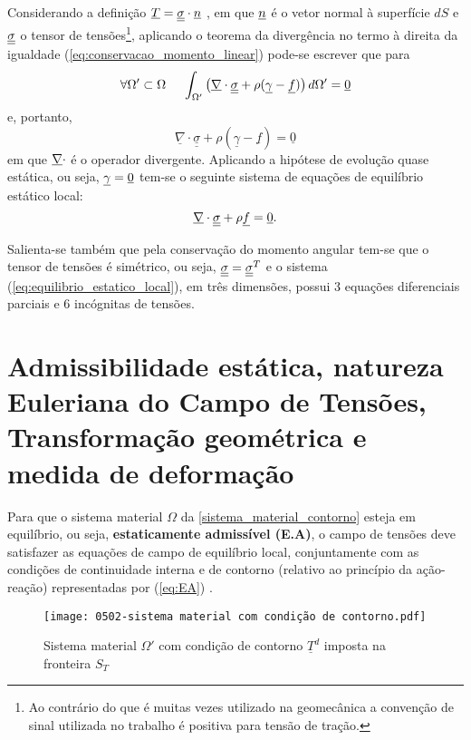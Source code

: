 Considerando a definição $\underline T = \underline{\underline \sigma} \cdot \underline n$ , em que $\underline n$ é o vetor normal à superfície $dS$ e $\underline{\underline \sigma}$ o tensor de tensões\footnote{Ao contrário do que é muitas vezes utilizado na geomecânica a convenção de sinal utilizada no trabalho é positiva para tensão de tração.}, aplicando o teorema da divergência no termo à direita da igualdade (\ref{eq:conservacao_momento_linear}) pode-se escrever que para
\begin{equation}
	\label{teorema_divergencia}
	\forall \Omega' \subset \Omega ~~~~ \int_{\Omega'}\left( \underline \nabla \cdot \underline{\underline \sigma}+ \rho(\underline \gamma-\underline f) \right)d\Omega' = \underline 0
\end{equation}
e, portanto,
\begin{equation}
	\label{eq:resultado_teorema_divergencia}
	 \underline \nabla \cdot \underline{\underline\sigma}+ \rho(\underline\gamma-\underline f) = \underline 0
\end{equation}
em que $\underline \nabla \cdot$ é o operador divergente. Aplicando a hipótese de evolução quase estática, ou seja, $\underline \gamma = \underline 0$ \cite[p. 369]{Salencon2001} tem-se o seguinte sistema de equações de equilíbrio estático local:
\begin{equation}
	\label{eq:equilibrio_estatico_local}
	\underline \nabla \cdot \underline{\underline \sigma}+ \rho \underline f = \underline 0.
\end{equation}

Salienta-se também que pela conservação do momento angular tem-se que o tensor de tensões é simétrico, ou seja, $\underline{\underline \sigma} = \underline{\underline \sigma}^T$ e o sistema (\ref{eq:equilibrio_estatico_local}), em três dimensões, possui 3 equações diferenciais parciais e 6 incógnitas de tensões.

\section{Admissibilidade estática, natureza Euleriana do Campo de Tensões, Transformação geométrica e medida de deformação}

Para que o sistema material $\Omega$ da \autoref{sistema_material_contorno} esteja em equilíbrio, ou seja, \textbf{estaticamente admissível (E.A)}, o campo de tensões deve satisfazer as equações de campo de equilíbrio local, conjuntamente com as condições de continuidade interna e de contorno (relativo ao princípio da ação-reação) representadas por (\ref{eq:EA}) \cite[p. 386]{Salencon2001}.

\begin{figure}[H]
	\begin{center}
		\texttt{[image: 0502-sistema material com condição de contorno.pdf]}
	\end{center}
	\caption{\label{sistema_material_contorno}Sistema material $\Omega'$ com condição de contorno $\underline T^d$ imposta na fronteira $S_T$}
\end{figure}

